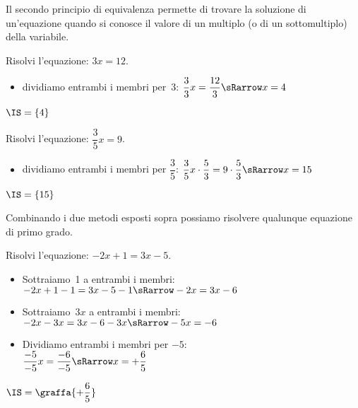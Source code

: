 
Il secondo principio di equivalenza permette di trovare la soluzione di 
un'equazione quando si conosce il valore di un multiplo (o di un 
sottomultiplo) della variabile.

\begin{esempio}{}{}
Risolvi l'equazione: \quad \(3x = 12\).

\begin{itemize}[left=0mm, nosep]
\item dividiamo entrambi i membri per~3: \quad 
\(\dfrac{3}{3}x = \dfrac{12}{3} \sRarrow x=4\)
\end{itemize}

\(\IS =\{4\}\)
\end{esempio}

\begin{esempio}{}{}
Risolvi l'equazione: \quad \(\dfrac{3}{5}x = 9\).

\begin{itemize}[left=0mm, nosep]
\item dividiamo entrambi i membri per \(\dfrac{3}{5}\): \quad 
\(\dfrac{3}{5}x \cdot \dfrac{5}{3}=9 \cdot \dfrac{5}{3} \sRarrow x=15\)
\end{itemize}

\(\IS =\{15\}\)
\end{esempio}


Combinando i due metodi esposti sopra possiamo risolvere qualunque 
equazione di primo grado.

\begin{esempio}{}{}
Risolvi l'equazione: \quad \(-2x+1=3x-5\).

\vspace{.5em}
\begin{itemize}[left=0mm, nosep]
\item Sottraiamo~1 a entrambi i membri: \\
\(-2x+1-1=3x-5-1 \sRarrow -2x = 3x  -6\)
\item Sottraiamo~\(3x\) a entrambi i membri: \\
\(-2x-3x = 3x-6 -3x \sRarrow -5x = -6\)
\item Dividiamo entrambi i membri per \(-5\): \\
\(\dfrac{-5}{-5}x = \dfrac{-6}{-5} \sRarrow x = +\dfrac{6}{5}\)
\end{itemize}

\(\IS =\graffa{+\dfrac{6}{5}}\)
\end{esempio}

